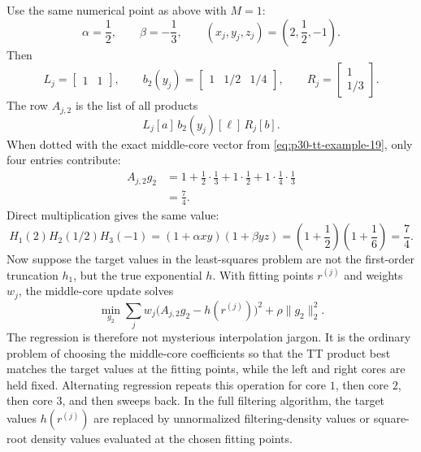 \documentclass[11pt]{article}
\numberwithin{equation}{section}
\begin{document}
Use the same numerical point as above with \(M=1\):
\[
    \alpha=\frac12,\qquad
    \beta=-\frac13,\qquad
    (x_j,y_j,z_j)=\left(2,\frac12,-1\right).
\]
Then
\begin{equation}
    L_j=\begin{bmatrix}1&1\end{bmatrix},
    \qquad
    b_2(y_j)=\begin{bmatrix}1&1/2&1/4\end{bmatrix},
    \qquad
    R_j=\begin{bmatrix}1\\1/3\end{bmatrix}.
    \label{eq:p30-tt-example-22}
\end{equation}
The row \(A_{j,2}\) is the list of all products
\[
    L_j[a]\,b_2(y_j)[\ell]\,R_j[b].
\]
When dotted with the exact middle-core vector from
\eqref{eq:p30-tt-example-19}, only four entries contribute:
\begin{equation}
\begin{aligned}
    A_{j,2}g_2
    &=
    1
    +\frac12\cdot\frac13
    +1\cdot\frac12
    +1\cdot\frac14\cdot\frac13\\
    &=
    \frac74.
\end{aligned}
    \label{eq:p30-tt-example-23}
\end{equation}
Direct multiplication gives the same value:
\begin{equation}
    H_1(2)H_2(1/2)H_3(-1)
    =
    (1+\alpha xy)(1+\beta yz)
    =
    \left(1+\frac12\right)\left(1+\frac16\right)
    =
    \frac74.
    \label{eq:p30-tt-example-24}
\end{equation}
Now suppose the target values in the least-squares problem are not the
first-order truncation \(h_1\), but the true exponential \(h\).  With fitting
points \(r^{(j)}\) and weights \(w_j\), the middle-core update solves
\begin{equation}
    \min_{g_2}
    \sum_j w_j\bigl(A_{j,2}g_2-h(r^{(j)})\bigr)^2+\rho\|g_2\|_2^2.
    \label{eq:p30-tt-example-25}
\end{equation}
The regression is therefore not mysterious interpolation jargon.  It is the
ordinary problem of choosing the middle-core coefficients so that the TT
product best matches the target values at the fitting points, while the left
and right cores are held fixed.  Alternating regression repeats this operation
for core \(1\), then core \(2\), then core \(3\), and then sweeps back.  In the
full filtering algorithm, the target values \(h(r^{(j)})\) are replaced by
unnormalized filtering-density values or square-root density values evaluated
at the chosen fitting points.
\end{document}
